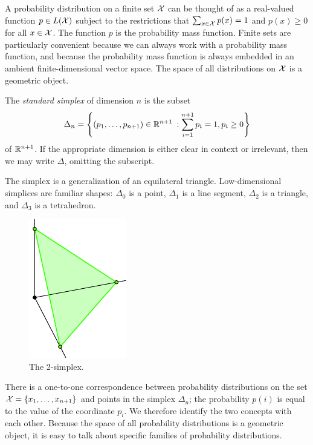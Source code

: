 \documentclass[cclicense]{hmcthesis}
\numberwithin{equation}{chapter}
\numberwithin{ucounter}{chapter}
\begin{document}
    A probability distribution on a finite set $\mathcal{X}$ can be thought of as a
    real-valued function $p \in L(\mathcal{X})$ subject to the restrictions that
    $\sum_{x\in \mathcal{X}} p(x) = 1$ and $p(x) \ge 0$ for all $x \in \mathcal{X}$.  The
    function $p$ is the probability mass function.  Finite sets are particularly
    convenient because we can always work with a probability mass function, and
    because the probability mass function is always embedded in an ambient
    finite-dimensional vector space.  The space of all distributions on $\mathcal{X}$ is
    a geometric object.
    
    \begin{definition} 
        The \emph{standard simplex} of dimension $n$ is the subset
        \[
            \Delta_n = 
            \left\{(p_1, \ldots, p_{n+1}) \in \mathbb{R}^{n+1} \::
            \sum_{i=1}^{n+1} p_i= 1, p_i \ge 0 \right\} 
        \]
        of $\mathbb{R}^{n+1}$.  If the appropriate dimension is either clear in context
        or irrelevant, then we may write $\Delta$, omitting the subscript.
    \end{definition}

    The simplex is a generalization of an equilateral triangle.  Low-dimensional
    simplices are familiar shapes: $\Delta_0$ is a point, $\Delta_1$ is a line
    segment, $\Delta_2$ is a triangle, and $\Delta_3$ is a tetrahedron.

    \begin{figure}[H]
        \centering
        \includegraphics[scale=1]{images/2-simplex.pdf}
        \caption{The 2-simplex.}
    \end{figure}

    There is a one-to-one correspondence between probability distributions on
    the set $\mathcal{X} = \{x_1, \ldots, x_{n+1}\}$ and points in the simplex
    $\Delta_n$; the probability $p(i)$ is equal to the value of the coordinate
    $p_i$.  We therefore identify the two concepts with each other.
    Because the space of all probability distributions is a geometric
    object, it is easy to talk about specific families of probability
    distributions.
\end{document}
